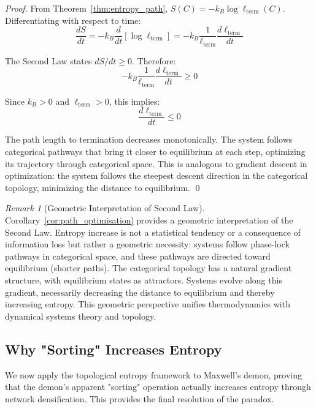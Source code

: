 \documentclass[12pt,a4paper]{article}
\theoremstyle{definition}
\theoremstyle{remark}
\newtheorem{remark}[theorem]{Remark}
\begin{document}
\begin{proof}
From Theorem~\ref{thm:entropy_path}, $S(C) = -k_B \log \ell_{\text{term}}(C)$. Differentiating with respect to time:
\begin{equation}
\frac{dS}{dt} = -k_B \frac{d}{dt}[\log \ell_{\text{term}}] = -k_B \frac{1}{\ell_{\text{term}}} \frac{d\ell_{\text{term}}}{dt}
\end{equation}

The Second Law states $dS/dt \geq 0$. Therefore:
\begin{equation}
-k_B \frac{1}{\ell_{\text{term}}} \frac{d\ell_{\text{term}}}{dt} \geq 0
\end{equation}

Since $k_B > 0$ and $\ell_{\text{term}} > 0$, this implies:
\begin{equation}
\frac{d\ell_{\text{term}}}{dt} \leq 0
\end{equation}

The path length to termination decreases monotonically. The system follows categorical pathways that bring it closer to equilibrium at each step, optimizing its trajectory through categorical space. This is analogous to gradient descent in optimization: the system follows the steepest descent direction in the categorical topology, minimizing the distance to equilibrium. \qed
\end{proof}

\begin{remark}[Geometric Interpretation of Second Law]
\label{rem:geometric_second_law}
Corollary~\ref{cor:path_optimisation} provides a geometric interpretation of the Second Law. Entropy increase is not a statistical tendency or a consequence of information loss but rather a geometric necessity: systems follow phase-lock pathways in categorical space, and these pathways are directed toward equilibrium (shorter paths). The categorical topology has a natural gradient structure, with equilibrium states as attractors. Systems evolve along this gradient, necessarily decreasing the distance to equilibrium and thereby increasing entropy. This geometric perspective unifies thermodynamics with dynamical systems theory and topology.
\end{remark}

\subsection{Why "Sorting" Increases Entropy}

We now apply the topological entropy framework to Maxwell's demon, proving that the demon's apparent "sorting" operation actually increases entropy through network densification. This provides the final resolution of the paradox.
\end{document}
